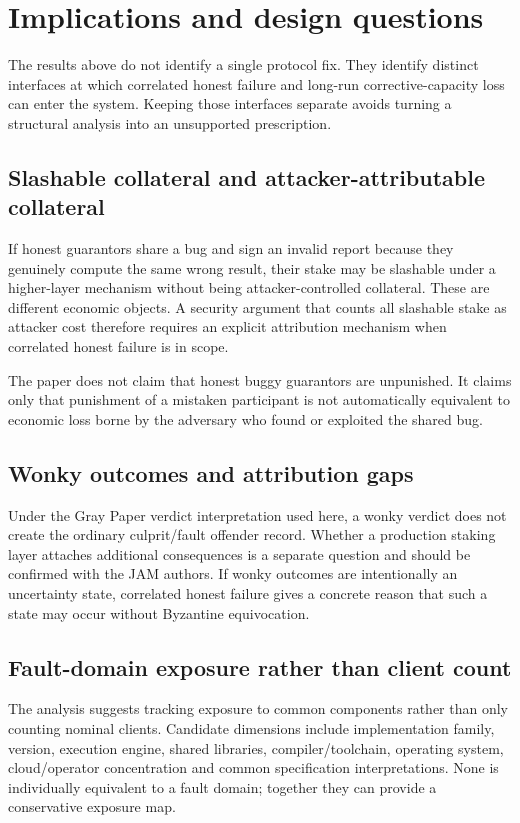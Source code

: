\section{Implications and design questions}

The results above do not identify a single protocol fix. They identify distinct interfaces at which correlated honest failure and long-run corrective-capacity loss can enter the system. Keeping those interfaces separate avoids turning a structural analysis into an unsupported prescription.

\subsection{Slashable collateral and attacker-attributable collateral}

If honest guarantors share a bug and sign an invalid report because they genuinely compute the same wrong result, their stake may be slashable under a higher-layer mechanism without being attacker-controlled collateral. These are different economic objects. A security argument that counts all slashable stake as attacker cost therefore requires an explicit attribution mechanism when correlated honest failure is in scope.

The paper does not claim that honest buggy guarantors are unpunished. It claims only that punishment of a mistaken participant is not automatically equivalent to economic loss borne by the adversary who found or exploited the shared bug.

\subsection{Wonky outcomes and attribution gaps}

Under the Gray Paper verdict interpretation used here, a wonky verdict does not create the ordinary culprit/fault offender record. Whether a production staking layer attaches additional consequences is a separate question and should be confirmed with the JAM authors. If wonky outcomes are intentionally an uncertainty state, correlated honest failure gives a concrete reason that such a state may occur without Byzantine equivocation.

\subsection{Fault-domain exposure rather than client count}

The analysis suggests tracking exposure to common components rather than only counting nominal clients. Candidate dimensions include implementation family, version, execution engine, shared libraries, compiler/toolchain, operating system, cloud/operator concentration and common specification interpretations. None is individually equivalent to a fault domain; together they can provide a conservative exposure map.

